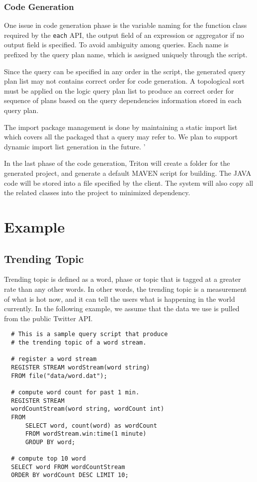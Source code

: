 \documentclass[conference, twocolumn, 11pt]{IEEEtran}
\theoremstyle{definition}
\begin{document}
\subsubsection{Code Generation}
One issue in code generation phase is the variable naming for the function class required by the \texttt{each} API, the output field of an expression or aggregator if no output field is specified. To avoid ambiguity among queries. Each name is prefixed by the query plan name, which is assigned uniquely through the script.

Since the query can be specified in any order in the script, the generated query plan list may not contains correct order for code generation. A topological sort must be applied on the logic query plan list to produce an correct order for sequence of plans based on the query dependencies information stored in each query plan.

The import package management is done by maintaining a static import list which covers all the packaged that a query may refer to. We plan to support dynamic import list generation in the future. '

In the last phase of the code generation, Triton will create a folder for the generated project, and generate a default MAVEN script for building. The JAVA code will be stored into a file specified by the client. The system will also copy all the related classes into the project to minimized dependency.

\section{Example}\label{example}
\subsection{Trending Topic}
Trending topic is defined as a word, phase or topic that is tagged at a greater rate than any other words. In other words, the trending topic is a measurement of what is hot now, and it
can tell the users what is happening in the world currently. In the following example, we assume that the data we use is pulled from the public Twitter API.
\footnotesize\begin{verbatim}
  # This is a sample query script that produce
  # the trending topic of a word stream.

  # register a word stream
  REGISTER STREAM wordStream(word string)
  FROM file("data/word.dat");

  # compute word count for past 1 min.
  REGISTER STREAM
  wordCountStream(word string, wordCount int)
  FROM
      SELECT word, count(word) as wordCount
      FROM wordStream.win:time(1 minute)
      GROUP BY word;

  # compute top 10 word
  SELECT word FROM wordCountStream
  ORDER BY wordCount DESC LIMIT 10;
\end{verbatim}
\normalsize
\end{document}
